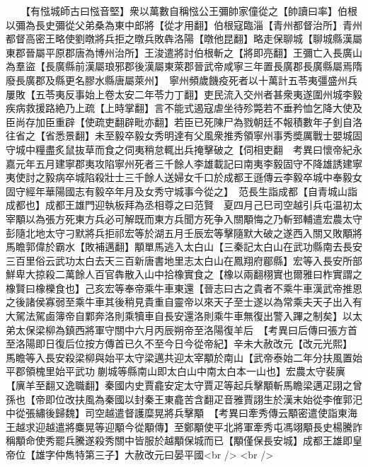 　　【有惤城師古曰惤音堅】衆以萬數自稱惤公王彌帥家僮從之【帥讀曰率】伯根以彌為長史彌從父弟桑為東中郎將【從才用翻】伯根寇臨淄【青州都督治所】青州都督高密王略使劉暾將兵拒之暾兵敗犇洛陽【暾他昆翻】略走保聊城【聊城縣漢屬東郡晉屬平原郡唐為博州治所】王浚遣將討伯根斬之【將即亮翻】王彌亡入長廣山為羣盜【長廣縣前漢屬琅邪郡後漢屬東萊郡晉武帝咸寧三年置長廣郡長廣縣屬焉隋廢長廣郡及縣更名膠水縣唐屬萊州】　寧州頻歲饑疫死者以十萬計五苓夷彊盛州兵屢敗【五苓夷反事始上卷太安二年苓力丁翻】吏民流入交州者甚衆夷遂圍州城李毅疾病救援路絶乃上疏【上時掌翻】言不能式遏寇虐坐待殄斃若不垂矜恤乞降大使及臣尚存加臣重辟【使疏吏翻辟毗亦翻】若臣已死陳尸為戮朝廷不報積數年子釗自洛往省之【省悉景翻】未至毅卒毅女秀明達有父風衆推秀領寧州事秀奬厲戰士嬰城固守城中糧盡炙鼠抜草而食之伺夷稍怠輒出兵掩擊破之【伺相吏翻　考異曰懷帝紀永嘉元年五月建寧郡夷攻陷寧州死者三千餘人李雄載記曰南夷李毅固守不降雄誘建寧夷使討之毅病卒城陷殺壯士三千餘人送婦女千口於成都王遜傳云李毅卒城中奉毅女固守經年華陽國志有毅卒年月及女秀守城事今從之】　范長生詣成都【自青城山詣成都也】成都王雄門迎執板拜為丞相尊之曰范賢　夏四月己巳司空越引兵屯温初太宰顒以為張方死東方兵必可解既而東方兵聞方死争入關顒悔之乃斬郅輔遣宏農太守彭隨北地太守刁默將兵拒祁宏等於湖五月壬辰宏等擊隨默大破之遂西入關又敗顒將馬瞻郭偉於霸水【敗補邁翻】顒單馬逃入太白山【三秦記太白山在武功縣南去長安三百里俗云武功太白去天三百新唐書地里志太白山在鳳翔府郿縣】宏等入長安所部鮮卑大掠殺二萬餘人百官犇散入山中拾橡實食之【橡以兩翻栩實也爾雅曰柞實謂之橡賢曰橡櫟食也】己亥宏等奉帝乘牛車東還【晉志曰古之貴者不乘牛車漢武帝推恩之後諸侯寡弱至乘牛車其後稍見貴重自靈帝以來天子至士遂以為常乘夫天子出入有大駕法駕鹵簿帝自鄴奔洛則乘犢車自長安還洛則乘牛車無復出警入蹕之制矣】以太弟太保梁柳為鎮西將軍守關中六月丙辰朔帝至洛陽復羊后　【考異曰后傳曰張方首至洛陽即日復后位按方傳首已久不至今日今從帝紀】辛未大赦改元【改元光熙】　馬瞻等入長安殺梁柳與始平太守梁邁共迎太宰顒於南山【武帝泰始二年分扶風置始平郡領槐里始平武功蒯城等縣南山即太白山中南太白本一山也】宏農太守裴廙【廙羊至翻又逸職翻】秦國内史賈龕安定太守賈疋等起兵擊顒斬馬瞻梁邁疋詡之曾孫也【帝即位改扶風為秦國以封秦王東龕苦含翻疋音雅賈詡生於漢末始從李傕郭汜中從張繡後歸魏】司空越遣督護糜晃將兵擊顒　【考異曰牽秀傳云顒密遣使詣東海王越求迎越遣將麋晃等迎顒今從顒傳】至鄭顒使平北將軍牽秀屯馮翊顒長史楊騰詐稱顒命使秀罷兵騰遂殺秀關中皆服於越顒保城而已【顒僅保長安城】成都王雄即皇帝位【雄字仲雋特第三子】大赦改元曰晏平國<br />
<br />
